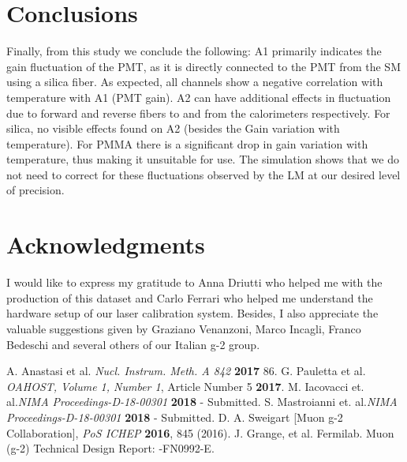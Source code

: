 \documentclass[article,accept,moreauthors,pdftex,10pt,a4paper]{Definitions/mdpi}
\begin{document}
\section{Conclusions}
Finally, from this study we conclude the following:
A1 primarily indicates the gain fluctuation of the PMT, as it is directly
 connected to the PMT from the SM using a silica fiber. As expected, all channels show a 
negative correlation with temperature with A1 (PMT gain). 
A2 can have additional effects in fluctuation due to forward and reverse fibers to and 
from the calorimeters respectively. For silica, no visible effects found on A2
 (besides the Gain variation with temperature).
For PMMA there is a significant drop in gain variation with temperature, thus making it 
unsuitable for use. 
The simulation shows that we do not need to correct for these fluctuations 
observed by the LM at our desired level of precision. 

\section*{Acknowledgments}
I would like to express my gratitude to Anna Driutti who helped me with the production of this dataset 
and Carlo Ferrari who helped me understand the hardware setup of our laser calibration system. 
Besides, I also appreciate the valuable suggestions given by Graziano Venanzoni, Marco Incagli, Franco Bedeschi 
and several others of our Italian g-2 group. 

\begin{thebibliography}{999}
A. Anastasi et al. {\em Nucl. Instrum. Meth. A 842} {\bf 2017} 86.
G. Pauletta et al. {\em OAHOST, Volume 1, Number 1}, Article Number 5 {\bf 2017}.
M. Iacovacci et. al.{\em NIMA Proceedings-D-18-00301}  {\bf 2018} - Submitted.
S. Mastroianni et. al.{\em NIMA Proceedings-D-18-00301} {\bf 2018} - Submitted.
D. A. Sweigart [Muon g-2 Collaboration], {\em PoS ICHEP} {\bf 2016}, 845 (2016).
J. Grange, et al. Fermilab. Muon (g-2) Technical Design Report: -FN0992-E.
\end{thebibliography}
\end{document}

